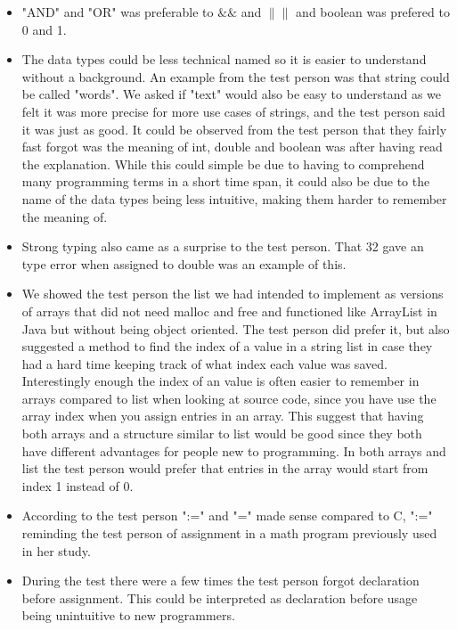 \begin{itemize}
    \item "AND" and "OR" was preferable to  $\&\&$ and $\|\|$ and boolean was prefered to 0 and 1. 
    \item The data types could be less technical named so it is easier to understand without a background. An example from the test person was that string could be called "words". We asked if "text" would also be easy to understand as we felt it was more precise for more use cases of strings, and the test person said it was just as good. It could be observed from the test person that they fairly fast forgot was the meaning of int, double and boolean was after having read the explanation. While this could simple be due to having to comprehend many programming terms in a short time span, it could also be due to the name of the data types being less intuitive, making them harder to remember the meaning of.
    \item Strong typing also came as a surprise to the test person. That 32 gave an type error when assigned to double was an example of this.
    \item We showed the test person the list we had intended to implement as versions of arrays that did not need malloc and free and functioned like ArrayList in Java but without being object oriented. The test person did prefer it, but also suggested a method to find the index of a value in a string list in case they had a hard time keeping track of what index each value was saved. Interestingly enough the index of an value is often easier to remember in arrays compared to list when looking at source code, since you have use the array index when you assign entries in an array. This suggest that having both arrays and a structure similar to list would be good since they both have different advantages for people new to programming. In both arrays and list the test person would prefer that entries in the array would start from index 1 instead of 0.
    \item According to the test person ":=" and "=" made sense compared to C, ":=" reminding the test person of assignment in a math program previously used in her study.
    \item During the test there were a few times the test person forgot declaration before assignment. This could be interpreted as declaration before usage being unintuitive to new programmers. 
\end{itemize}

